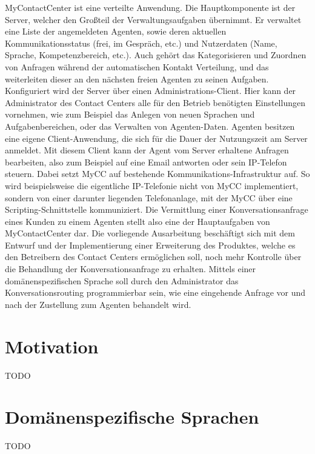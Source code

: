 MyContactCenter ist eine verteilte Anwendung. Die Hauptkomponente ist der Server, welcher den Großteil der Verwaltungsaufgaben übernimmt. Er verwaltet eine Liste der angemeldeten Agenten, sowie deren aktuellen Kommunikationsstatus (frei, im Gespräch, etc.) und Nutzerdaten (Name, Sprache, Kompetenzbereich, etc.). Auch gehört das Kategorisieren und Zuordnen von Anfragen während der automatischen Kontakt Verteilung, und das weiterleiten dieser an den nächsten freien Agenten zu seinen Aufgaben. Konfiguriert wird der Server über einen Administrations-Client. Hier kann der Administrator des Contact Centers alle für den Betrieb benötigten Einstellungen vornehmen, wie zum Beispiel das Anlegen von neuen Sprachen und Aufgabenbereichen, oder das Verwalten von Agenten-Daten. Agenten besitzen eine eigene Client-Anwendung, die sich für die Dauer der Nutzungszeit am Server anmeldet.  Mit diesem Client kann der Agent vom Server erhaltene Anfragen bearbeiten, also zum Beispiel auf eine Email antworten oder sein IP-Telefon steuern. Dabei setzt MyCC auf bestehende Kommunikations-Infrastruktur auf. So wird beispielsweise die eigentliche IP-Telefonie nicht von MyCC implementiert, sondern von einer darunter liegenden Telefonanlage, mit der MyCC über eine Scripting-Schnittstelle kommuniziert.
\newline
Die Vermittlung einer Konversationsanfrage eines Kunden zu einem Agenten stellt also eine der Hauptaufgaben von MyContactCenter dar. Die vorliegende Ausarbeitung beschäftigt sich mit dem Entwurf und der Implementierung einer Erweiterung des Produktes, welche es den Betreibern des Contact Centers ermöglichen soll, noch mehr Kontrolle über die Behandlung der Konversationsanfrage zu erhalten. Mittels einer domänenspezifischen Sprache soll durch den Administrator das Konversationsrouting programmierbar sein, wie eine eingehende Anfrage vor und nach der Zustellung zum Agenten behandelt wird.  
















\section{Motivation}
TODO

\section{Domänenspezifische Sprachen}
TODO

